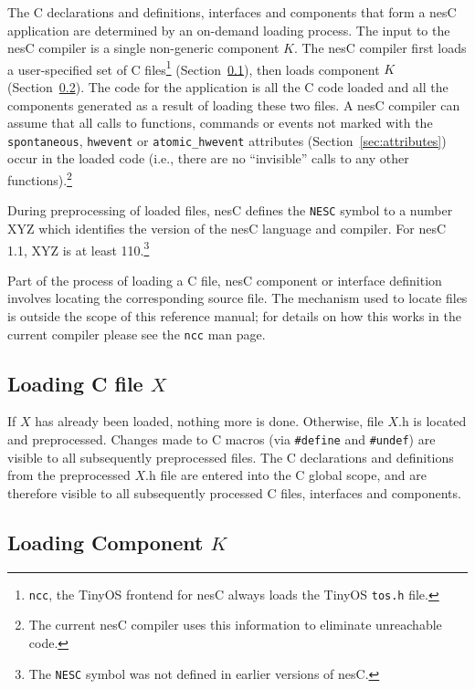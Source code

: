 \documentclass[11pt,letterpaper]{article}
\newcommand{\kw}[1]{{\tt #1}}
\newcommand{\code}[1]{{\tt #1}}
\newcommand{\file}[1]{{\tt #1}}
\newcommand{\nesc}{nesC\xspace}
\begin{document}
The C declarations and definitions, interfaces and components that form
a \nesc application are determined by an on-demand loading process. The
input to the \nesc compiler is a single non-generic component $K$. The
\nesc compiler first loads a user-specified set of C
files\footnote{\kw{ncc}, the TinyOS frontend for \nesc always loads the
TinyOS \file{tos.h} file.} (Section~\ref{sec:load-c}), then loads component
$K$ (Section~\ref{sec:load-component}). The code for the application is all
the C code loaded and all the components generated as a result of loading
these two files. A \nesc compiler can assume that all calls to functions,
commands or events not marked with the \code{spontaneous}, \code{hwevent}
or \code{atomic\_hwevent} attributes (Section~\ref{sec:attributes}) occur
in the loaded code (i.e., there are no ``invisible'' calls to any other
functions).\footnote{The current \nesc compiler uses this
information to eliminate unreachable code.}

During preprocessing of loaded files, \nesc defines the \kw{NESC} symbol to
a number XYZ which identifies the version of the \nesc language and compiler.
For \nesc 1.1, XYZ is at least 110.\footnote{The \kw{NESC} symbol was not
defined in earlier versions of \nesc.}

Part of the process of loading a C file, \nesc component or interface
definition involves locating the corresponding source file. The mechanism
used to locate files is outside the scope of this reference manual; for
details on how this works in the current compiler please see the \file{ncc}
man page.

\subsection{Loading C file $X$}
\label{sec:load-c}

If $X$ has already been loaded, nothing more is done. Otherwise, file $X$.h
is located and preprocessed. Changes made to C macros (via \code{\#define}
and \code{\#undef}) are visible to all subsequently preprocessed files. The C
declarations and definitions from the preprocessed $X$.h file are entered
into the C global scope, and are therefore visible to all subsequently
processed C files, interfaces and components.

\subsection{Loading Component $K$}
\label{sec:load-component}
\end{document}
